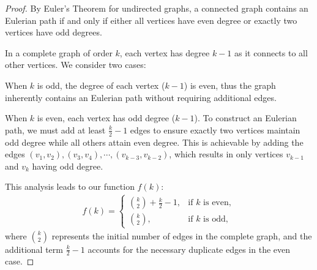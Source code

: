 \documentclass{biometrika}
\renewcommand{\_}{\raisebox{.5pt}{\underline{\phantom{x}}}}
\begin{document}
\begin{bibunit}[biometrika]
\begin{proof}
 By Euler's Theorem \citep{polya1983hamiltonian} for undirected graphs, a connected graph contains an Eulerian path if and only if either all vertices have even degree or exactly two vertices have odd degrees.
   
   In a complete graph of order $k$, each vertex has degree $k-1$ as it connects to all other vertices. We consider two cases:
   
   When $k$ is odd, the degree of each vertex ($k-1$) is even, thus the graph inherently contains an Eulerian path without requiring additional edges.
   
When $k$ is even, each vertex has odd degree ($k-1$). To construct an Eulerian path, we must add at least $\frac{k}{2}-1$ edges to ensure exactly two vertices maintain odd degree while all others attain even degree. This is achievable by adding the edges $\left(v_1, v_2\right), \left(v_3, v_4\right), \cdots, \left(v_{k-3}, v_{k-2}\right)$, which results in only vertices $v_{k-1}$ and $v_k$ having odd degree.

   This analysis leads to our function $f(k)$:
   \begin{align}
       f(k) = 
       \begin{cases}
           \binom{k}{2} + \frac{k}{2} - 1, & \text{if } k \text{ is even}, \\
           \binom{k}{2},                    & \text{if } k \text{ is odd},
       \end{cases}
   \end{align}
   where $\binom{k}{2}$ represents the initial number of edges in the complete graph, and the additional term $\frac{k}{2} - 1$ accounts for the necessary duplicate edges in the even case.
\end{proof}
\begin{theorem}
\label{thm:bound_2_contraction}

\end{theorem}

\putbib[Master]
\end{bibunit}
\end{document}
